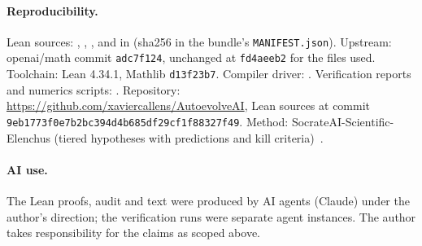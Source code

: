 \documentclass[11pt]{article}
\begin{document}
\paragraph{Reproducibility.} Lean sources: , , ,  and  in
 (sha256 in the bundle's \texttt{MANIFEST.json}). Upstream: \mbox{openai/math} commit \texttt{adc7f124}, unchanged at \texttt{fd4aeeb2} for the files used. Toolchain: Lean 4.34.1, Mathlib
\texttt{d13f23b7}. Compiler driver: . Verification reports and numerics scripts:
. Repository: \url{https://github.com/xaviercallens/AutoevolveAI}, Lean sources at commit
\texttt{9eb1773f0e7b2bc3\allowbreak 94d4b685df29cf1f\allowbreak 88327f49}.
Method: SocrateAI-Scientific-Elenchus (tiered hypotheses with predictions and kill criteria)~\cite{elenchus}.

\paragraph{AI use.} The Lean proofs, audit and text were produced by AI agents (Claude) under the author's direction; the verification runs
were separate agent instances. The author takes responsibility for the claims as scoped above.
\end{document}
